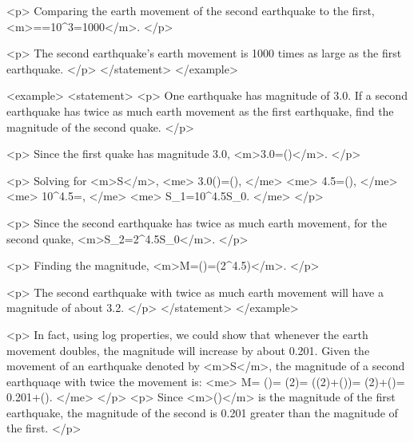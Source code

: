                 <p>
                    Comparing the earth movement of the second earthquake to the first, <m>==10^{3}=1000</m>.
                </p>

                <p>
                    The second earthquake’s earth movement is 1000 times as large as the first earthquake.
                </p>
            </statement>
        </example>

        <example>
            <statement>
                <p>
                    One earthquake has magnitude of 3.0.
                    If a second earthquake has twice as much earth movement as the first earthquake, find the magnitude of the second quake.
                </p>

                <p>
                    Since the first quake has magnitude 3.0, <m>3.0=\log()</m>.
                </p>

                <p>
                    Solving for <m>S</m>,
                    <me>
                        3.0()=\log(),
                    </me>
                    <me>
                        4.5=\log(),
                    </me>
                    <me>
                        10^{4.5}=,
                    </me>
                    <me>
                        S_{1}=10^{4.5}S_{0}.
                    </me>
                </p>

                <p>
                    Since the second earthquake has twice as much earth movement, for the second quake, <m>S_{2}=2^{4.5}S_{0}</m>.
                </p>

                <p>
                    Finding the magnitude, <m>M=\log()=\log(2^{4.5})</m>.
                </p>

                <p>
                    The second earthquake with twice as much earth movement will have a magnitude of about 3.2.
                </p>
            </statement>
        </example>

        <p>
            In fact, using log properties, we could show that whenever the earth movement doubles, the magnitude will increase by about 0.201.
            Given the movement of an earthquake denoted by <m>S</m>, the magnitude of a second earthquaqe with twice the movement is:
        <me>
            M= \log()= \log(2)= (\log(2)+\log())= \log(2)+\log()= 0.201+\log().
        </me>
        </p>
        <p>
            Since <m>\log()</m> is the magnitude of the first earthquake, the magnitude of the second is 0.201 greater than the magnitude of the first.
        </p>

